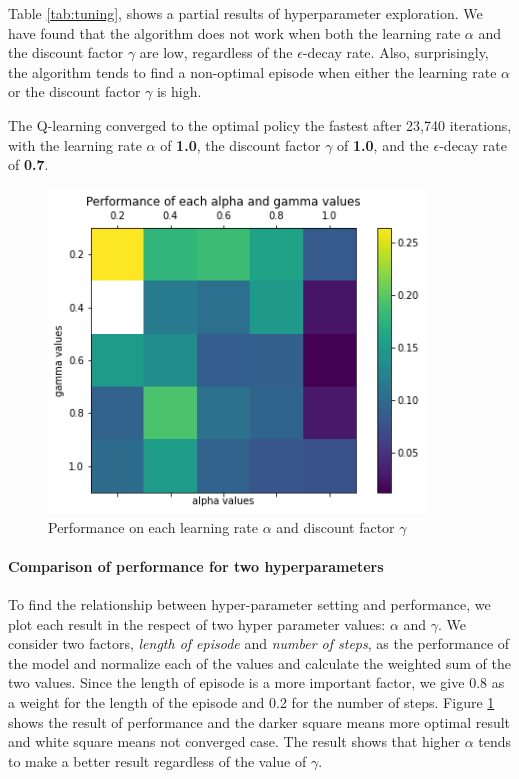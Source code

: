 \documentclass{article}
\begin{document}
Table \ref{tab:tuning}, shows a partial results of hyperparameter exploration. We have found that the algorithm does not work when both the learning rate $\alpha$ and the discount factor $\gamma$ are low, regardless of the $\epsilon$-decay rate. Also, surprisingly, the algorithm tends to find a non-optimal episode when either the learning rate $\alpha$ or the discount factor $\gamma$ is high.

The Q-learning converged to the optimal policy the fastest after 23,740 iterations, with the learning rate $\alpha$ of \textbf{1.0}, the discount factor $\gamma$ of \textbf{1.0}, and the $\epsilon$-decay rate of \textbf{0.7}.

\begin{figure}[h]
    \centering
    \includegraphics[width=10cm]{output.png}
    \caption{Performance on each learning rate $\alpha$ and discount factor $\gamma$}
    \label{fig:output}
\end{figure}

\paragraph{Comparison of performance for two hyperparameters}
To find the relationship between hyper-parameter setting and performance, we plot each result in the respect of two hyper parameter values: $\alpha$ and $\gamma$. We consider two factors, \textit{length of episode} and \textit{number of steps}, as the performance of the model and normalize each of the values and calculate the weighted sum of the two values. Since the length of episode is a more important factor, we give 0.8 as a weight for the length of the episode and 0.2 for the number of steps. Figure \ref{fig:output} shows the result of performance and the darker square means more optimal result and white square means not converged case. The result shows that higher $\alpha$ tends to make a better result regardless of the value of $\gamma$.
\end{document}
